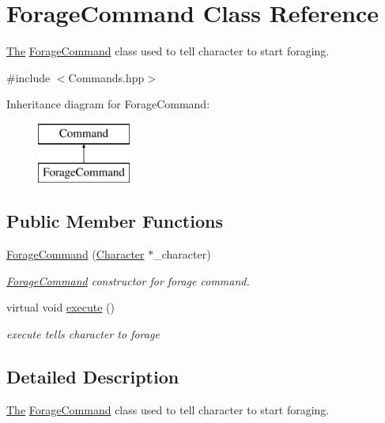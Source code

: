 \hypertarget{class_forage_command}{}\section{Forage\+Command Class Reference}
\label{class_forage_command}


\hyperlink{namespace_the}{The} \hyperlink{class_forage_command}{Forage\+Command} class used to tell character to start foraging.  




{\ttfamily \#include $<$Commands.\+hpp$>$}

Inheritance diagram for Forage\+Command\+:\begin{figure}[H]
\begin{center}
\leavevmode
\includegraphics[height=2.000000cm]{class_forage_command}
\end{center}
\end{figure}
\subsection*{Public Member Functions}
\begin{DoxyCompactItemize}
\item 
\hyperlink{class_forage_command_ad72401f88f43f94639c977039b6b1939}{Forage\+Command} (\hyperlink{class_character}{Character} $\ast$\+\_\+character)
\begin{DoxyCompactList}\small\item\em \hyperlink{class_forage_command}{Forage\+Command} constructor for forage command. \end{DoxyCompactList}\item 
\hypertarget{class_forage_command_adf0482c47214e823d0d0348928865b80}{}virtual void \hyperlink{class_forage_command_adf0482c47214e823d0d0348928865b80}{execute} ()\label{class_forage_command_adf0482c47214e823d0d0348928865b80}

\begin{DoxyCompactList}\small\item\em execute tells character to forage \end{DoxyCompactList}\end{DoxyCompactItemize}


\subsection{Detailed Description}
\hyperlink{namespace_the}{The} \hyperlink{class_forage_command}{Forage\+Command} class used to tell character to start foraging. 

